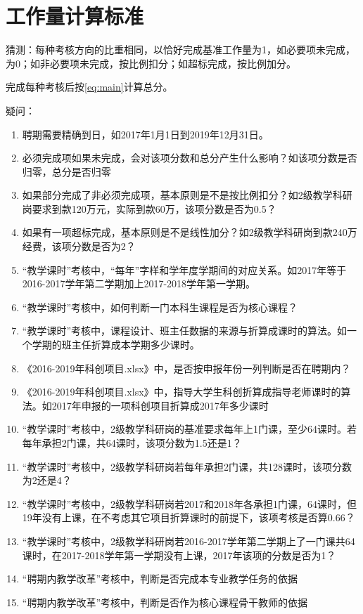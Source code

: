 \documentclass[UTF8,fontset=windowsnew]{ctexart}
\begin{document}
\section{工作量计算标准}
猜测：每种考核方向的比重相同，以恰好完成基准工作量为1，如必要项未完成，为0；如非必要项未完成，按比例扣分；如超标完成，按比例加分。\par
完成每种考核后按\autoref{eq:main}计算总分。\par
疑问：
\begin{enumerate}
  \item 聘期需要精确到日，如2017年1月1日到2019年12月31日。
  \item 必须完成项如果未完成，会对该项分数和总分产生什么影响？如该项分数是否归零，总分是否归零
  \item 如果部分完成了非必须完成项，基本原则是不是按比例扣分？如2级教学科研岗要求到款120万元，实际到款60万，该项分数是否为0.5？
  \item 如果有一项超标完成，基本原则是不是线性加分？如2级教学科研岗到款240万经费，该项分数是否为2？
  \item ``教学课时''考核中，``每年''字样和学年度学期间的对应关系。如2017年等于2016-2017学年第二学期加上2017-2018学年第一学期。
  \item ``教学课时''考核中，如何判断一门本科生课程是否为核心课程？
  \item ``教学课时''考核中，课程设计、班主任数据的来源与折算成课时的算法。如一个学期的班主任折算成本学期多少课时。
  \item 《2016-2019年科创项目.xlsx》中，是否按申报年份一列判断是否在聘期内？
  \item 《2016-2019年科创项目.xlsx》中，指导大学生科创折算成指导老师课时的算法。如2017年申报的一项科创项目折算成2017年多少课时
  \item ``教学课时''考核中，2级教学科研岗的基准要求每年上1门课，至少64课时。若每年承担2门课，共64课时，该项分数为1.5还是1？
  \item ``教学课时''考核中，2级教学科研岗若每年承担2门课，共128课时，该项分数为2还是4？
  \item ``教学课时''考核中，2级教学科研岗若2017和2018年各承担1门课，64课时，但19年没有上课，在不考虑其它项目折算课时的前提下，该项考核是否算0.66？
  \item ``教学课时''考核中，2级教学科研岗若2016-2017学年第二学期上了一门课共64课时，在2017-2018学年第一学期没有上课，2017年该项的分数是否为1？
  \item ``聘期内教学改革''考核中，判断是否完成本专业教学任务的依据
  \item ``聘期内教学改革''考核中，判断是否作为核心课程骨干教师的依据

\end{enumerate}
\end{document}

